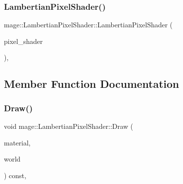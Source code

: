 \hypertarget{classmage_1_1_lambertian_pixel_shader_aca051307ad7fac78bbc8a87c80387960}{}\label{classmage_1_1_lambertian_pixel_shader_aca051307ad7fac78bbc8a87c80387960} 
\subsubsection{\texorpdfstring{Lambertian\+Pixel\+Shader()}{LambertianPixelShader()}\hspace{0.1cm}{\footnotesize\ttfamily [3/3]}}
{\footnotesize\ttfamily mage\+::\+Lambertian\+Pixel\+Shader\+::\+Lambertian\+Pixel\+Shader (\begin{DoxyParamCaption}\item[{\hyperlink{classmage_1_1_lambertian_pixel_shader}{Lambertian\+Pixel\+Shader} \&\&}]{pixel\+\_\+shader }\end{DoxyParamCaption})\hspace{0.3cm}{\ttfamily [private]}, {\ttfamily [delete]}}



\subsection{Member Function Documentation}
\hypertarget{classmage_1_1_lambertian_pixel_shader_a7394a51578de77cd7e57b9bd63895ffd}{}\label{classmage_1_1_lambertian_pixel_shader_a7394a51578de77cd7e57b9bd63895ffd} 
\subsubsection{\texorpdfstring{Draw()}{Draw()}}
{\footnotesize\ttfamily void mage\+::\+Lambertian\+Pixel\+Shader\+::\+Draw (\begin{DoxyParamCaption}\item[{const \hyperlink{structmage_1_1_material}{Material} \&}]{material,  }\item[{const \hyperlink{classmage_1_1_world}{World} \&}]{world }\end{DoxyParamCaption}) const\hspace{0.3cm}{\ttfamily [override]}, {\ttfamily [virtual]}}



